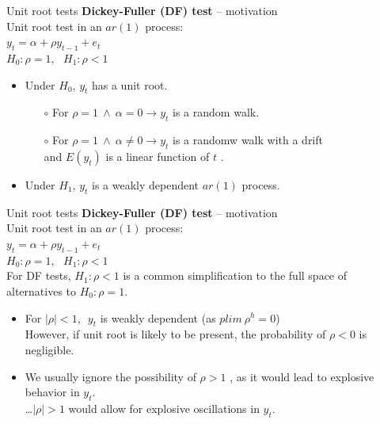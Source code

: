 \documentclass[usenames,dvipsnames]{beamer}
\begin{document}
\begin{frame}{Unit root tests}
\textbf{Dickey-Fuller (DF) test} – motivation \\
\medskip
Unit root test in an $\textit{ar}(1)$ process: \\
\medskip
$y_t = \alpha + \rho y_{t-1} + e_t$\\
\medskip
$ H_0 : \rho = 1, \> \> \> H_1 : \rho <1$ \\
\medskip
\begin{itemize}
\item Under $H_0$, $y_t$ has a unit root. 
\begin{itemize}
\item[$\circ$] For  $\rho =1 \ \wedge \ \alpha =0 \rightarrow y_t$     is a random walk.
\item[$\circ$] For  $\rho =1 \ \wedge \ \alpha \neq 0 \rightarrow y_t$     is a randomw walk with a drift   \\and $E(y_t)$ is a linear function of $t$ .
\end{itemize}
\item Under $H_1$, $y_t$  is a weakly dependent $\textit{ar}(1)$ process. \\
\bigskip
\end{itemize}
\medskip
\end{frame}
\begin{frame}{Unit root tests}
\textbf{Dickey-Fuller (DF) test} – motivation \\
\medskip
Unit root test in an $\textit{ar}(1)$ process: \\
\medskip
$y_t = \alpha + \rho y_{t-1} + e_t$\\
\medskip
$ H_0 : \rho = 1, \> \> \> H_1 : \rho <1$ \\
\medskip
For DF tests, $H_1 : \rho <1$ is a common simplification to the full space of alternatives to $H_0: \rho = 1$.
\begin{itemize}
\item For $|\rho|<1$, $\,\, y_t$  is weakly dependent (as $\textit{plim} \> \rho^h=0$)\\
However, if unit root is likely to be present, the probability of $\rho<0$ is negligible.
\item We usually ignore the possibility of $\rho >1$   , as it would lead to explosive behavior in $y_t$. \\
\dots $|\rho|>1$ would allow for explosive oscillations in $y_t$.
\end{itemize}
\end{frame}
\end{document}
